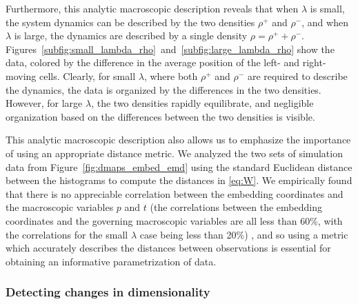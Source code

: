 Furthermore, this analytic macroscopic description reveals that when $\lambda$ is small, the system dynamics can be described by the two densities $\rho^+$ and $\rho^-$, and when $\lambda$ is large, the dynamics are described by a single density $\rho = \rho^+ + \rho^-$.
%
Figures~\ref{subfig:small_lambda_rho}~and~\ref{subfig:large_lambda_rho} show the data, colored by the difference in the average position of the left- and right-moving cells.
%
Clearly, for small $\lambda$, where both $\rho^+$ and $\rho^-$ are required to describe the dynamics, the data is organized by the differences in the two densities.
%
However, for large $\lambda$, the two densities rapidly equilibrate, and negligible organization based on the differences between the two densities is visible.


This analytic macroscopic description also allows us to emphasize the importance of using an appropriate distance metric.
%
We analyzed the two sets of simulation data from Figure~\ref{fig:dmaps_embed_emd} using the standard Euclidean distance between the histograms to compute the distances in \eqref{eq:W}.
%
We empirically found that there is no appreciable correlation between the embedding coordinates and the macroscopic variables $p$ and $t$ (the correlations between the embedding coordinates and the governing macroscopic variables are all less than 60\%, with the correlations for the small $\lambda$ case being less than 20\%)
%
, and so using a metric which accurately describes the distances between observations is essential for obtaining an informative parametrization of data.

\subsubsection{Detecting changes in dimensionality}

